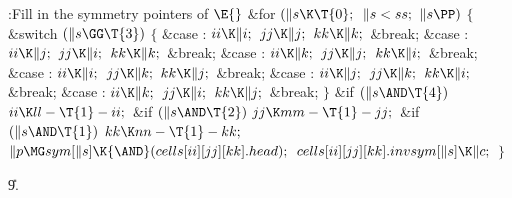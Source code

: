 \B{}:Fill in the symmetry pointers of \X${}\E{}$\6
\&{for} ${}(\|s\K\T{0};{}$ ${}\|s<\\{ss};{}$ ${}\|s\PP){}$\5
${}\{{}$\1\6
\&{switch} ${}(\|s\GG\T{3}){}$\5
${}\{{}$\1\6
\4\&{case} :\5
${}\\{ii}\K\|i;{}$\6
${}\\{jj}\K\|j;{}$\6
${}\\{kk}\K\|k;{}$\6
\&{break};\6
\4\&{case} :\5
${}\\{ii}\K\|j;{}$\6
${}\\{jj}\K\|i;{}$\6
${}\\{kk}\K\|k;{}$\6
\&{break};\6
\4\&{case} :\5
${}\\{ii}\K\|k;{}$\6
${}\\{jj}\K\|j;{}$\6
${}\\{kk}\K\|i;{}$\6
\&{break};\6
\4\&{case} :\5
${}\\{ii}\K\|i;{}$\6
${}\\{jj}\K\|k;{}$\6
${}\\{kk}\K\|j;{}$\6
\&{break};\6
\4\&{case} :\5
${}\\{ii}\K\|j;{}$\6
${}\\{jj}\K\|k;{}$\6
${}\\{kk}\K\|i;{}$\6
\&{break};\6
\4\&{case} :\5
${}\\{ii}\K\|k;{}$\6
${}\\{jj}\K\|i;{}$\6
${}\\{kk}\K\|j;{}$\6
\&{break};\6
\4${}\}{}$\2\6
\&{if} ${}(\|s\AND\T{4}){}$\1\5
${}\\{ii}\K\\{ll}-\T{1}-\\{ii};{}$\2\6
\&{if} ${}(\|s\AND\T{2}){}$\1\5
${}\\{jj}\K\\{mm}-\T{1}-\\{jj};{}$\2\6
\&{if} ${}(\|s\AND\T{1}){}$\1\5
${}\\{kk}\K\\{nn}-\T{1}-\\{kk};{}$\2\6
${}\|p\MG\\{sym}[\|s]\K{\AND}(\\{cells}[\\{ii}][\\{jj}][\\{kk}].\\{head});{}$\6
${}\\{cells}[\\{ii}][\\{jj}][\\{kk}].\\{invsym}[\|s]\K\|c;{}$\6
\4${}\}{}$\2\par
\U9.\fi

